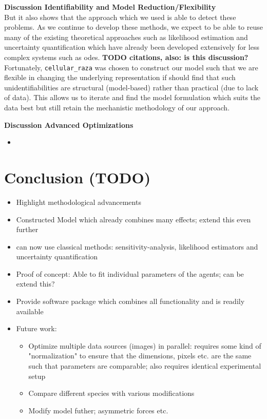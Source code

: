 \documentclass{article}
\begin{document}
\textbf{Discussion Identifiability and Model Reduction/Flexibility}\\
But it also shows that the approach which we used is able to detect these problems.
As we continue to develop these methods, we expect to be able to reuse many of the existing
theoretical approaches such as likelihood estimation and uncertainty quantification which have
already been developed extensively for less complex systems such as \acp{ode}.
\textbf{TODO citations, also: is this discussion?}
Fortunately, \texttt{cellular\_raza} was chosen to construct our model such that we are flexible in
changing the underlying representation if should find that such unidentifiabilities are structural
(model-based) rather than practical (due to lack of data).
This allows us to iterate and find the model formulation which suits the data best but still retain
the mechanistic methodology of our approach.

\textbf{Discussion Advanced Optimizations}\\
\begin{itemize}
    \item 
\end{itemize}

\section{Conclusion (TODO)}

\begin{itemize}
    \item Highlight methodological advancements
    \item Constructed Model which already combines many effects; extend this even further
    \item can now use classical methods: sensitivity-analysis, likelihood estimators and uncertainty quantification
    \item Proof of concept: Able to fit individual parameters of the agents; can be extend this?
    \item Provide software package which combines all functionality and is readily available
    \item Future work:
    \begin{itemize}
        \item Optimize multiple data sources (images) in parallel: requires some kind of
        "normalization" to ensure that the dimensions, pixels etc. are the same such that parameters
        are comparable; also requires identical experimental setup
        \item Compare different species with various modifications
        \item Modify model futher; asymmetric forces etc.
    \end{itemize}
\end{itemize}
\end{document}
